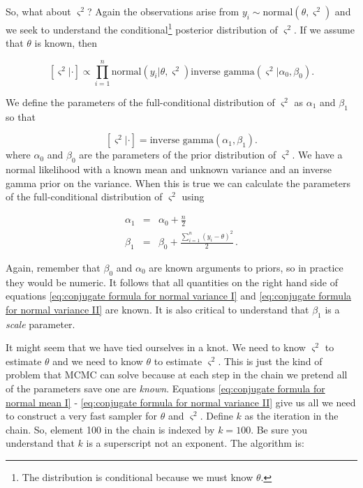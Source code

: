 \documentclass[11pt]{article}
\begin{document}
So, what about $\varsigma^{2}$? Again the observations arise from $y_{i}\sim\text{normal}\left(\theta,\varsigma^{2}\right)$ and we seek to understand the conditional\footnote{The distribution is conditional because we must know $\theta.$} posterior distribution of $\varsigma^{2}$. If we assume that $\theta$ is known, then 

\begin{equation}
\left[\varsigma^{2}|\cdot\right]\propto\prod_{i=1}^{n}\text{normal}\left(y_{i}|\theta,\varsigma^{2}\right)\text{inverse gamma}\left(\varsigma^{2}|\alpha_{0},\beta_{0}\right).\label{eq:posterior distribution of var sigma}
\end{equation}

We define the parameters of the full-conditional distribution of $\varsigma^{2}$ as $\alpha_{1}$ and $\beta_{1}$ so that

\begin{equation}
\left[\varsigma^{2}|\cdot\right]=\text{inverse gamma}\left(\alpha_{1},\beta_{1}\right).
\end{equation}
where $\alpha_0$ and $\beta_0$ are the parameters of the prior distribution of $\varsigma^2$. We have a normal likelihood with a known mean and unknown variance and an inverse gamma prior on the variance. When this is true we can calculate the parameters of the full-conditional distribution of $\varsigma^{2}$ using 

\begin{eqnarray}
\alpha_{1} & = & \alpha_{0}+\frac{n}{2}\label{eq:conjugate formula for normal variance I}\\
\beta_{1} & = & \beta_{0}+\frac{\sum_{i=1}^{n}{(y_{i}-\theta)^{2}}}{2}\,.\label{eq:conjugate formula for normal variance II}
\end{eqnarray}

Again, remember that $\beta_{0}$ and $\alpha_{0}$ are known arguments to priors, so in practice they would be numeric. It follows that all quantities on the right hand side of equations \ref{eq:conjugate formula for normal variance I} and \ref{eq:conjugate formula for normal variance II} are known. It is also critical to understand that $\beta_1$ is a \emph{scale} parameter.

It might seem that we have tied ourselves in a knot. We need to know $\varsigma^{2}$ to estimate $\theta$ and we need to know $\theta$ to estimate $\varsigma^{2}.$ This is just the kind of problem that MCMC can solve because at each step in the chain we pretend all of the parameters save one are \emph{known}. Equations \ref{eq:conjugate formula for normal mean I} - \ref{eq:conjugate formula for normal variance II} give us all we need to construct a very fast sampler for $\theta$ and $\varsigma^{2}$. Define $k$ as the iteration in the chain. So, element 100 in the chain is indexed by $k=100$. Be sure you understand that $k$ is a superscript not an exponent. The algorithm is:
\end{document}
